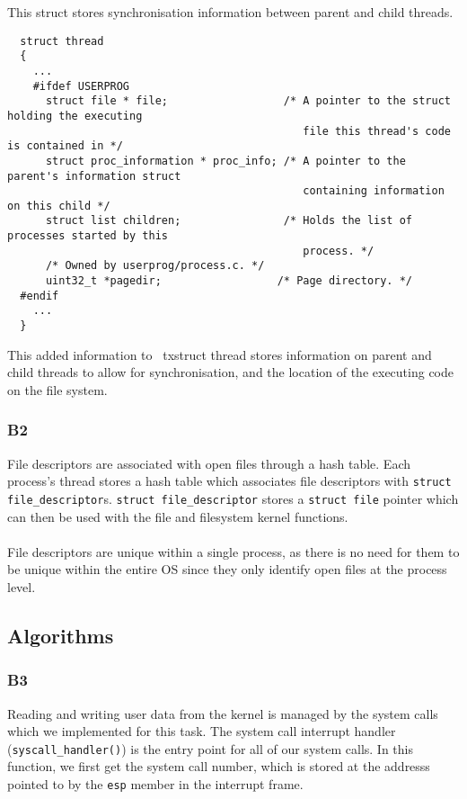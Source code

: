 \documentclass[a4wide, 11pt]{article}
\newcommand{\tab}{\hspace*{2em}}
\newcommand{\tx}{\texttt}
\begin{document}
\tab This struct stores synchronisation information between parent and child threads.

\begin{verbatim}
  struct thread
  {
    ...
    #ifdef USERPROG
      struct file * file;                  /* A pointer to the struct holding the executing 
                                              file this thread's code is contained in */
      struct proc_information * proc_info; /* A pointer to the parent's information struct
                                              containing information on this child */
      struct list children;                /* Holds the list of processes started by this
                                              process. */
      /* Owned by userprog/process.c. */
      uint32_t *pagedir;                  /* Page directory. */
  #endif
    ...
  }
\end{verbatim}

\tab This added information to \  tx{struct thread} stores information on parent and child threads to allow for synchronisation, and the location of the executing code on the file system.

\subsubsection{B2}

File descriptors are associated with open files through a hash table. Each process's thread stores a hash table which associates file descriptors with \tx{struct file\_descriptor}s. \tx{struct file\_descriptor} stores a \tx{struct file} pointer which can then be used with the file and filesystem kernel functions.
\\\\
File descriptors are unique within a single process, as there is no need for them to be unique within the entire OS since they only identify open files at the process level.

\subsection{Algorithms}
\subsubsection{B3}

Reading and writing user data from the kernel is managed by the system calls which we implemented for this task. The system call interrupt handler (\tx{syscall\_handler()}) is the entry point for all of our system calls. In this function, we first get the system call number, which is stored at the addresss pointed to by the \tx{esp} member in the interrupt frame.
\end{document}
